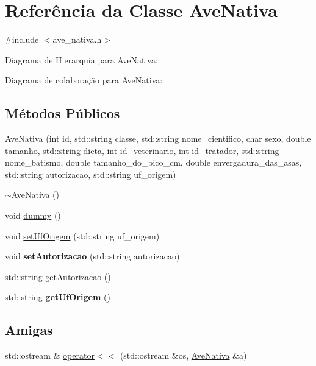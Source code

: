 \hypertarget{classAveNativa}{}\section{Referência da Classe Ave\+Nativa}
\label{classAveNativa}


{\ttfamily \#include $<$ave\+\_\+nativa.\+h$>$}



Diagrama de Hierarquia para Ave\+Nativa\+:


Diagrama de colaboração para Ave\+Nativa\+:
\subsection*{Métodos Públicos}
\begin{DoxyCompactItemize}
\item 
\hyperlink{classAveNativa_a39eb462984ca5ec684f2f10c814061d7}{Ave\+Nativa} (int id, std\+::string classe, std\+::string nome\+\_\+cientifico, char sexo, double tamanho, std\+::string dieta, int id\+\_\+veterinario, int id\+\_\+tratador, std\+::string nome\+\_\+batismo, double tamanho\+\_\+do\+\_\+bico\+\_\+cm, double envergadura\+\_\+das\+\_\+asas, std\+::string autorizacao, std\+::string uf\+\_\+origem)
\item 
\hyperlink{classAveNativa_a99f26c9e02d0714a29f595bd8ecfaf5b}{$\sim$\+Ave\+Nativa} ()
\item 
void \hyperlink{classAveNativa_ad4af9772d84390bc0646dcfc9cd931ee}{dummy} ()
\item 
void \hyperlink{classAveNativa_a32b27a5520b20c3420696b51d3850f25}{set\+Uf\+Origem} (std\+::string uf\+\_\+origem)
\item 
\mbox{\label{classAveNativa_af731381a0d2984bf28c7497e03316e4f}} 
void {\bfseries set\+Autorizacao} (std\+::string autorizacao)
\item 
std\+::string \hyperlink{classAveNativa_ad6a42e383e34113af96e5d6ac1304b10}{get\+Autorizacao} ()
\item 
\mbox{\label{classAveNativa_a4e66513f96f77cbe9feccbc7eeefa1d5}} 
std\+::string {\bfseries get\+Uf\+Origem} ()
\end{DoxyCompactItemize}
\subsection*{Amigas}
\begin{DoxyCompactItemize}
\item 
std\+::ostream \& \hyperlink{classAveNativa_ac527e4db529c8efbbd1ba28bc72eede7}{operator$<$$<$} (std\+::ostream \&os, \hyperlink{classAveNativa}{Ave\+Nativa} \&a)
\end{DoxyCompactItemize}
